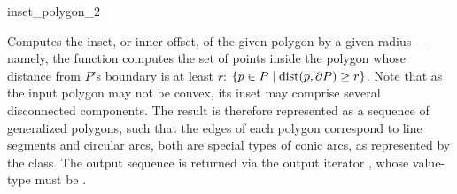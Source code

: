 
\ccRefPageBegin

\begin{ccRefFunction}{inset_polygon_2}


   {Computes the inset, or inner offset, of the given polygon  by a
    given radius  --- namely, the function computes the set of points
    inside the polygon whose distance from $P$'s boundary is at least $r$:
    $\{ p \in P \;|\; {\rm dist}(p, \partial P) \geq r \}$.
    Note that as the input polygon may not be convex, its inset may comprise
    several disconnected components. The result is therefore represented as a
    sequence of generalized polygons, such that the edges of each polygon
    correspond to line segments and circular arcs, both are special types of
    conic arcs, as represented by the  class.
    The output sequence is returned via the output iterator , whose
    value-type must be .
    }

\end{ccRefFunction}

\ccRefPageEnd
